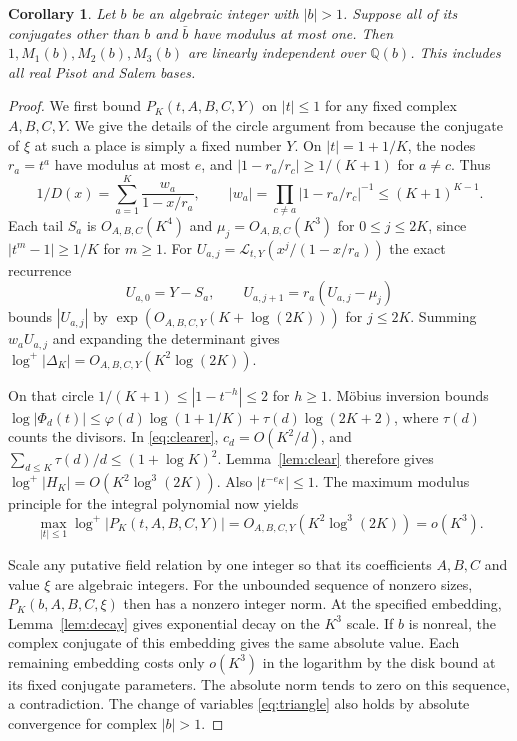 \documentclass[11pt]{article}
\newtheorem{corollary}[theorem]{Corollary}
\newcommand{\Q}{\mathbb Q}
\newcommand{\cl}{\mathcal L}
\newcommand{\ph}{\varphi}
\begin{document}
\begin{corollary}\label{cor:field}
Let \(b\) be an algebraic integer with \(|b|>1\). Suppose all of
its conjugates other than \(b\) and \(\bar b\) have modulus at most
one. Then \(1,M_1(b),M_2(b),M_3(b)\) are linearly independent
over \(\Q(b)\). This includes all real Pisot and Salem bases.
\end{corollary}
\begin{proof}
We first bound \(P_K(t,A,B,C,Y)\) on \(|t|\le1\) for any fixed
complex \(A,B,C,Y\). We give the details of the circle argument
from \cite[\S4]{Golden} because the conjugate of \(\xi\) at such a
place is simply a fixed number \(Y\).
On \(|t|=1+1/K\), the nodes \(r_a=t^a\) have modulus at most \(e\),
and \(|1-r_a/r_c|\ge1/(K+1)\) for \(a\ne c\). Thus
\[
 1/D(x)=\sum_{a=1}^K\frac{w_a}{1-x/r_a},\qquad
 |w_a|=\prod_{c\ne a}|1-r_a/r_c|^{-1}\le(K+1)^{K-1}.
\]
Each tail \(S_a\) is \(O_{A,B,C}(K^4)\) and \(\mu_j=O_{A,B,C}(K^3)\)
for \(0\le j\le2K\), since \(|t^m-1|\ge1/K\) for \(m\ge1\).
For \(U_{a,j}=\cl_{t,Y}(x^j/(1-x/r_a))\) the exact recurrence
\[
 U_{a,0}=Y-S_a,\qquad U_{a,j+1}=r_a(U_{a,j}-\mu_j)
\]
bounds \(|U_{a,j}|\) by \(\exp(O_{A,B,C,Y}(K+\log(2K)))\) for
\(j\le2K\). Summing \(w_a U_{a,j}\) and expanding the determinant
gives \(\log^+|\Delta_K|=O_{A,B,C,Y}(K^2\log(2K))\).

On that circle \(1/(K+1)\le |1-t^{-h}|\le2\) for \(h\ge1\).
M\"obius inversion bounds
\(\log|\Phi_d(t)|\le\ph(d)\log(1+1/K)+\tau(d)\log(2K+2)\),
where \(\tau(d)\) counts the divisors. In \eqref{eq:clearer},
\(c_d=O(K^2/d)\), and
\(\sum_{d\le K}\tau(d)/d\le(1+\log K)^2\).
Lemma~\ref{lem:clear} therefore gives
\(\log^+|H_K|=O(K^2\log^3(2K))\). Also \(|t^{-e_K}|\le1\).
The maximum modulus principle for the integral polynomial now yields
\[
 \max_{|t|\le1}\log^+|P_K(t,A,B,C,Y)|
                  =O_{A,B,C,Y}(K^2\log^3(2K))=o(K^3).
\]

Scale any putative field relation by one integer so that its
coefficients \(A,B,C\) and value \(\xi\) are algebraic integers.
For the unbounded sequence of nonzero sizes, \(P_K(b,A,B,C,\xi)\)
then has a nonzero integer norm. At the specified embedding,
Lemma~\ref{lem:decay} gives exponential decay on the \(K^3\) scale.
If \(b\) is nonreal, the complex conjugate of this embedding gives
the same absolute value. Each remaining embedding costs only
\(o(K^3)\) in the logarithm by the disk bound at its fixed conjugate
parameters. The absolute norm tends to zero on this sequence,
a contradiction. The change of variables \eqref{eq:triangle}
also holds by absolute convergence for complex \(|b|>1\).
\end{proof}
\end{document}
